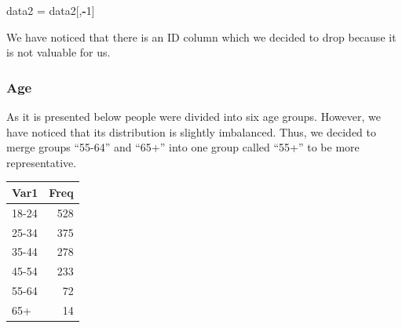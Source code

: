 \documentclass[
]{article}
\newenvironment{Shaded}{\begin{snugshade}}{\end{snugshade}}
\newcommand{\DataTypeTok}[1]{\textcolor[rgb]{0.13,0.29,0.53}{#1}}
\newcommand{\DecValTok}[1]{\textcolor[rgb]{0.00,0.00,0.81}{#1}}
\newcommand{\KeywordTok}[1]{\textcolor[rgb]{0.13,0.29,0.53}{\textbf{#1}}}
\newcommand{\NormalTok}[1]{#1}
\newcommand{\OperatorTok}[1]{\textcolor[rgb]{0.81,0.36,0.00}{\textbf{#1}}}
\newcommand{\OtherTok}[1]{\textcolor[rgb]{0.56,0.35,0.01}{#1}}
\newcommand{\StringTok}[1]{\textcolor[rgb]{0.31,0.60,0.02}{#1}}
\begin{document}
\begin{Shaded}
\begin{Highlighting}[]
\NormalTok{data2 =}\StringTok{ }\NormalTok{data2[,}\OperatorTok{-}\DecValTok{1}\NormalTok{]}
\end{Highlighting}
\end{Shaded}

We have noticed that there is an ID column which we decided to drop
because it is not valuable for us.

\hypertarget{age}{%
\subsubsection{Age}\label{age}}

As it is presented below people were divided into six age groups.
However, we have noticed that its distribution is slightly imbalanced.
Thus, we decided to merge groups ``55-64'' and ``65+'' into one group
called ``55+'' to be more representative.

\begin{Shaded}
\end{Shaded}

\begin{longtable}[]{@{}lr@{}}
\toprule
Var1 & Freq\tabularnewline
\midrule
\endhead
18-24 & 528\tabularnewline
25-34 & 375\tabularnewline
35-44 & 278\tabularnewline
45-54 & 233\tabularnewline
55-64 & 72\tabularnewline
65+ & 14\tabularnewline
\bottomrule
\end{longtable}

\begin{Shaded}
\end{Shaded}
\end{document}
